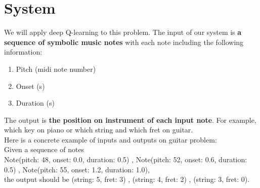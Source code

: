 \documentclass[12pt]{article}
\begin{document}
\section*{System}
We will apply deep Q-learning to this problem. The input of our system is \textbf{a sequence of symbolic music notes} with each note including the following information:
\begin{enumerate}
    \item Pitch (midi note number)
    \item Onset (s)
    \item Duration (s)
\end{enumerate}
The output is \textbf{the position on instrument of each input note}. For example, which key on piano or which string and which fret on guitar.\\
Here is a concrete example of inputs and outputs on guitar problem:\\
Given a sequence of notes \\
Note(pitch: 48, onset: 0.0, duration: 0.5) , Note(pitch: 52, onset: 0.6, duration: 0.5) , Note(pitch: 55, onset: 1.2, duration: 1.0), \\
the output should be (string: 5, fret: 3) , (string: 4, fret: 2) , (string: 3, fret: 0).
\end{document}
